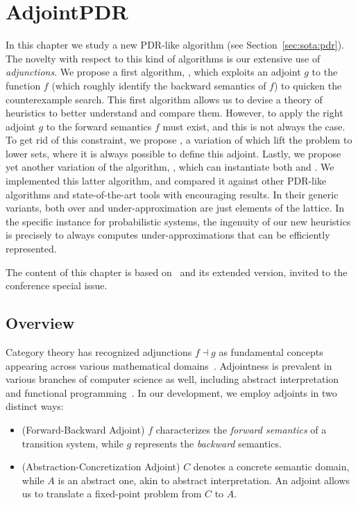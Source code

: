 
\chapter{AdjointPDR}\label{ch:pdr}
In this chapter we study a new PDR-like algorithm (see Section~\ref{sec:sota:pdr}).
The novelty with respect to this kind of algorithms is our extensive use of \emph{adjunctions}. We propose a first algorithm, \APDR{}, which exploits an adjoint $g$ to the function $f$ (which roughly identify the backward semantics of $f$) to quicken the counterexample search. This first algorithm allows us to devise a theory of heuristics to better understand and compare them.
However, to apply \APDR{} the right adjoint $g$ to the forward semantics $f$ must exist, and this is not always the case. To get rid of this constraint, we propose \ADPDR{}, a variation of \APDR{} which lift the problem to lower sets, where it is always possible to define this adjoint.
Lastly, we propose yet another variation of the algorithm, \APDRAI{}, which can instantiate both \APDR{} and \ADPDR{}. We implemented this latter algorithm, and compared it against other PDR-like algorithms and state-of-the-art tools with encouraging results.
In their generic variants, both over and under-approximation are just elements of the lattice. In the specific instance for probabilistic systems, the ingenuity of our new heuristics is precisely to always computes under-approximations that can be efficiently represented.

The content of this chapter is based on~\cite{KABBGH23} and its extended version, invited to the conference special issue.

\section{Overview}
Category theory has recognized adjunctions $f \dashv g$ as fundamental concepts appearing across various mathematical domains~\cite{Lawvere69}. Adjointness is prevalent in various branches of computer science as well, including abstract interpretation and functional programming~\cite{Levy2004}. In our development, we employ adjoints in two distinct ways:
\begin{itemize}
	\item (Forward-Backward Adjoint) $f$ characterizes the \emph{forward semantics} of a transition system, while $g$ represents the \emph{backward} semantics.
	\item (Abstraction-Concretization Adjoint) $C$ denotes a concrete semantic domain, while $A$ is an abstract one, akin to abstract interpretation. An adjoint allows us to translate a fixed-point problem from $C$ to $A$.
\end{itemize}

